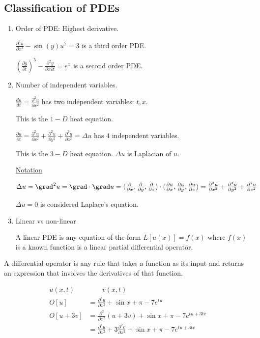 \subsection{Classification of PDEs}
\begin{enumerate}
  \item Order of PDE: Highest derivative.

  \Ex $\frac{\partial^3 u}{\partial x^3} - \sin(y) u^7 = 3$ is a third order PDE.

  \Ex $(\frac{\partial y}{\partial t})^5 - \frac{\partial^2y}{\partial x \partial t} = e^x$ is a second order PDE.
  \item Number of independent variables.

  \Ex $\frac{du}{dt} = \frac{\partial^2 u}{\partial x^2}$ has two independent variables: $t, x$.

  This is the $1-D$ heat equation.

  \Ex $\frac{\partial u}{\partial t} = \frac{\partial^2 u}{\partial x^2} + \frac{\partial^2 u}{\partial y^2} + \frac{\partial^2 u}{\partial z^2} = \Delta u$ has 4 independent variables.

  This is the $3-D$ heat equation. $\Delta u$ is Laplacian of $u$.

  \underline{Notation}

  $
  \Delta u =
  \grad^2 u =
  \grad \cdot \grad u =
  (\frac{\partial}{\partial x}, \frac{\partial}{\partial y}, \frac{\partial}{\partial z}) \cdot (\frac{\partial u}{\partial x}, \frac{\partial u}{\partial y}, \frac{\partial u}{\partial z}) =
  \frac{\partial^2 u}{\partial x^2} + \frac{\partial^2 u}{\partial y^2} + \frac{\partial^2 u}{\partial z^2}
  $

  $\Delta u = 0$ is considered Laplace's equation.
  \item Linear vs non-linear

  A linear PDE is any equation of the form $L[u(x)] = f(x)$ where $f(x)$ is a known function is a linear partial differential operator.
\end{enumerate}

\dfn A differential operator is any rule that takes a function as its input and returns an expression that involves the derivatives of that function.

\Ex
%
\begin{align}
  u(x, t) & \qquad v(x, t)\\
  O[u] & = \frac{\partial^2 u}{\partial x^2} + \sin x + \pi - 7e^{tu}\\
  O[u + 3v] & = \frac{\partial^2}{\partial x^2}(u + 3v) + \sin x + \pi - 7e^{tu + 3tv}\\
  & = \frac{\partial^2 u}{\partial x^2} + 3 \frac{\partial^2 v}{\partial x^2}+ \sin x + \pi - 7e^{tu + 3tv}
\end{align}

